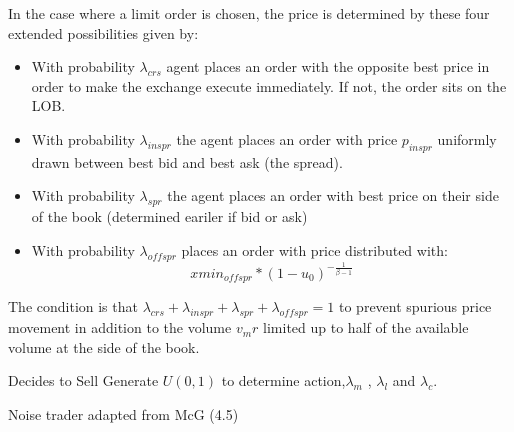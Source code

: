 \documentclass{article}
\begin{document}
In the case where a limit order is chosen, the price is determined by these four extended possibilities given by: 
\begin{itemize}
  \item With probability $\lambda_{crs}$ agent places an order with the opposite best price in order to make the exchange execute immediately. If not, the order sits on the LOB. 
  \item With probability $\lambda_{inspr}$ the agent places an order with price $p_{inspr}$ uniformly drawn between best bid and best ask (the spread). 
  \item With probability $\lambda_{spr}$ the agent places an order with best price on their side of the book (determined eariler if bid or ask)
  \item With probability $\lambda_{offspr}$ places an order with price distributed with:  
  \[ xmin_{offspr} * (1-u_0)^{-\frac{1}{\beta - 1}} \]
\end{itemize}
The condition is that $\lambda_{crs} + \lambda_{inspr} + \lambda_{spr} + \lambda_{offspr} = 1$ to prevent spurious price movement in addition to the volume $v_mr$ limited up to half of the available volume at the side of the book. 

\begin{algorithm}[H]
\DontPrintSemicolon 
{} {

     {
    Decides to Sell\;
    }
    \EndIf
    Generate $U(0,1)$ to determine action,$\lambda_{m}$ , $\lambda_{l}$ and $\lambda_{c}$.
    
    {
    }
  }
\EndIf
\caption{{\sc Noise trader adapted from McG (4.5) \cite{McGroarty}} }
\end{algorithm}
\end{document}
